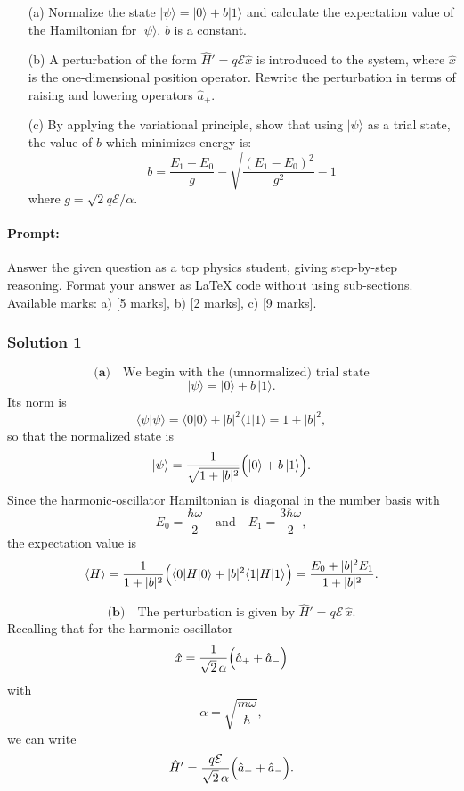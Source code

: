 \documentclass{article}
\begin{document}
\begin{enumerate}
    \item[(a)] Normalize the state \(|\psi\rangle = |0\rangle + b |1\rangle\) and calculate the expectation value of the Hamiltonian for \(|\psi\rangle\). \(b\) is a constant.
    
    \item[(b)] A perturbation of the form \(\hat{H}' = q \mathcal{E} \hat{x}\) is introduced to the system, where \(\hat{x}\) is the one-dimensional position operator. Rewrite the perturbation in terms of raising and lowering operators \(\hat{a}_\pm\).
    
    \item[(c)] By applying the variational principle, show that using \(|\psi\rangle\) as a trial state, the value of \(b\) which minimizes energy is:
    \[
    b = \frac{E_1 - E_0}{g} - \sqrt{\frac{(E_1 - E_0)^2}{g^2} - 1}
    \]
    where \(g = \sqrt{2}q\mathcal{E}/\alpha\).
\end{enumerate}

\paragraph{Prompt: \\} 
Answer the given question as a top physics student, giving step-by-step reasoning. Format your answer as LaTeX code without using sub-sections. Available marks: a) [5 marks], b) [2 marks], c) [9 marks].

\subsubsection{Solution 1}
\[
\textbf{(a)}\quad\text{We begin with the (unnormalized) trial state}
\]
\[
|\psi\rangle = |0\rangle + b\,|1\rangle.
\]
Its norm is
\[
\langle\psi|\psi\rangle = \langle 0|0\rangle + |b|^2\langle 1|1\rangle = 1 + |b|^2,
\]
so that the normalized state is
\[
|\psi\rangle = \frac{1}{\sqrt{1+|b|^2}}\Bigl(|0\rangle + b\,|1\rangle\Bigr).
\]
Since the harmonic‐oscillator Hamiltonian is diagonal in the number basis with
\[
E_0 = \frac{\hbar\omega}{2}\quad\text{and}\quad E_1 = \frac{3\hbar\omega}{2},
\]
the expectation value is
\[
\langle H\rangle = \frac{1}{1+|b|^2}\Bigl(\langle 0|H|0\rangle + |b|^2\langle 1|H|1\rangle\Bigr)
=\frac{E_0+|b|^2E_1}{1+|b|^2}.
\]

\[
\textbf{(b)}\quad\text{The perturbation is given by } \hat{H}' = q\mathcal{E}\,\hat{x}.
\]
Recalling that for the harmonic oscillator
\[
\hat{x} = \frac{1}{\sqrt{2}\,\alpha}\Bigl(\hat{a}_+ + \hat{a}_-\Bigr)
\]
with
\[
\alpha = \sqrt{\frac{m\omega}{\hbar}},
\]
we can write
\[
\hat{H}' = \frac{q\mathcal{E}}{\sqrt{2}\,\alpha}\Bigl(\hat{a}_+ + \hat{a}_-\Bigr).
\]
\end{document}
